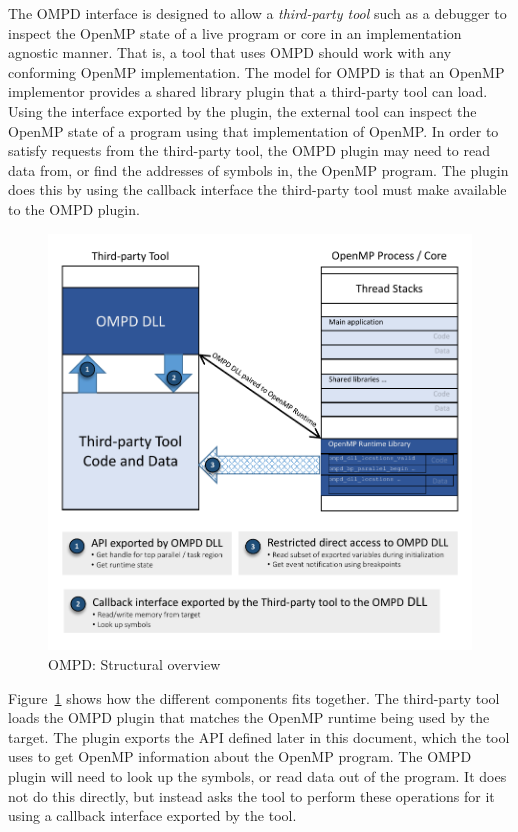 \label{sec:ompd:ompd-overview}

The OMPD interface is designed to allow a \emph{third-party tool}
such as a debugger to inspect the OpenMP state of a live program
or core in an implementation agnostic manner.
That is, a tool that uses OMPD should work with any conforming
OpenMP implementation.
The model for OMPD is that an OpenMP implementor provides a shared
library plugin that a third-party tool can load.
Using the interface exported by the plugin, the external tool can
inspect the OpenMP state of a program using that implementation of OpenMP.
In order to satisfy requests from the third-party tool, the OMPD plugin
may need to read data from, or find the addresses of symbols in,
the OpenMP program.
The plugin does this by using the callback interface the third-party
tool must make available to the OMPD plugin.

\begin{figure}
  \centering
    \includegraphics[width=5.0in,natwidth=424.8,natheight=417.6]{figures/ompd-structural-overview.pdf}
  \caption{OMPD: Structural overview}
\label{fig:ompd:structural-overview}
\end{figure}


Figure~\ref{fig:ompd:structural-overview} shows how the different
components fits together.
The third-party tool loads the OMPD plugin that matches the OpenMP runtime
being used by the target.
The plugin exports the API defined later in this document,
which the tool uses to get OpenMP information about the OpenMP program.
The OMPD plugin will need to look up the symbols,
or read data out of the program.
It does not do this directly, but instead asks the tool to perform
these operations for it using a callback interface exported by the tool.

